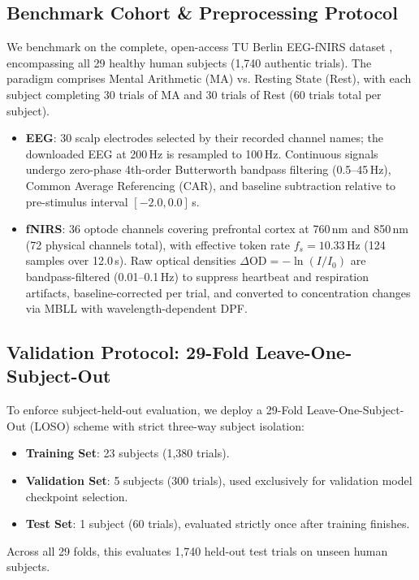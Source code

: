 \documentclass[final,5p,times,twocolumn]{elsarticle}
\begin{document}
\subsection{Benchmark Cohort \& Preprocessing Protocol}
We benchmark on the complete, open-access TU Berlin EEG-fNIRS dataset \cite{shin2017open}, encompassing all 29 healthy human subjects (1,740 authentic trials). The paradigm comprises Mental Arithmetic (MA) vs. Resting State (Rest), with each subject completing 30 trials of MA and 30 trials of Rest (60 trials total per subject).
\begin{itemize}
    \item \textbf{EEG}: 30 scalp electrodes selected by their recorded channel names; the downloaded EEG at 200\,Hz is resampled to 100\,Hz. Continuous signals undergo zero-phase 4th-order Butterworth bandpass filtering (0.5--45\,Hz), Common Average Referencing (CAR), and baseline subtraction relative to pre-stimulus interval $[-2.0, 0.0]$\,s.
    \item \textbf{fNIRS}: 36 optode channels covering prefrontal cortex at 760\,nm and 850\,nm (72 physical channels total), with effective token rate $f_s = 10.33$\,Hz (124 samples over 12.0\,s). Raw optical densities $\Delta \text{OD} = -\ln(I/I_0)$ are bandpass-filtered (0.01--0.1\,Hz) to suppress heartbeat and respiration artifacts, baseline-corrected per trial, and converted to concentration changes via MBLL with wavelength-dependent DPF.
\end{itemize}

\subsection{Validation Protocol: 29-Fold Leave-One-Subject-Out}
To enforce subject-held-out evaluation, we deploy a 29-Fold Leave-One-Subject-Out (LOSO) scheme with strict three-way subject isolation:
\begin{itemize}
    \item \textbf{Training Set}: 23 subjects (1,380 trials).
    \item \textbf{Validation Set}: 5 subjects (300 trials), used exclusively for validation model checkpoint selection.
    \item \textbf{Test Set}: 1 subject (60 trials), evaluated strictly once after training finishes.
\end{itemize}
Across all 29 folds, this evaluates 1,740 held-out test trials on unseen human subjects.
\end{document}

